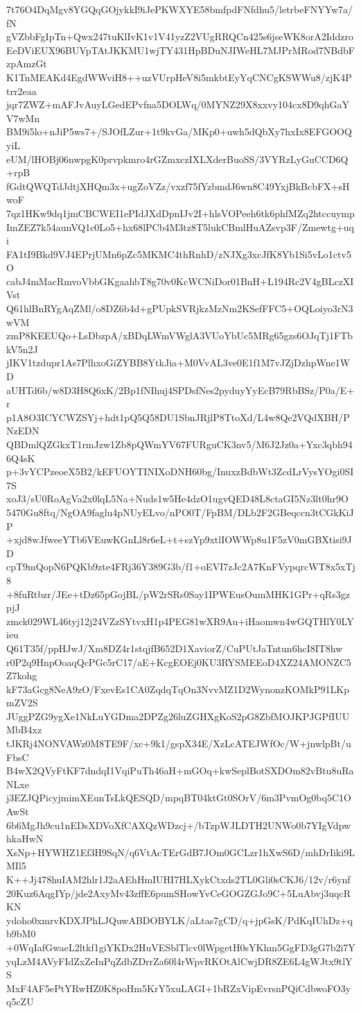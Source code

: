 7t76O4DqMgv8YGQqGOjykkI9iJePKWXYE58bmfpdFNfdhu5/letrbeFNYYw7a/fN
gVZbbFgIpTn+Qwx247tuKlIvK1v1V41yzZ2VUgRRQCn425s6jseWK8orA2Iddzro
EeDViEUX96BUVpTAtJKKMU1wjTY431HpBDuNJIWeHL7MJPrMRod7NBdbFzpAmzGt
K1TnMEAKd4EgdWWviH8++uzVUrpHeV8i5mkbtEyYqCNCgKSWWu8/zjK4Ptrr2eaa
jqr7ZWZ+mAFJvAuyLGedEPvfna5DOLWq/0MYNZ29X8xxvy104cx8D9qhGaYV7wMn
BM9i5lo+nJiP5ws7+/SJOfLZur+1t9kvGa/MKp0+uwh5dQbXy7hxIx8EFGOOQyiL
eUM/lHOBj06nwpgK0prvpkmro4rGZmxczIXLXderBuoSS/3VYRzLyGuCCD6Q+rpB
fGdtQWQTdJdtjXHQm3x+ugZoVZz/vxzf75fYzbmdJ6wn8C49YxjBkBcbFX+sHwoF
7qz1HKw9dq1jmCBCWEI1ePIdJXdDpnIJv2I+hlsVOPeeh6tk6phfMZq2htccuymp
ImZEZ7k54aunVQ1c0Lo5+hx68lPCb4M3tz8T5lukCBmlHuAZsvp3F/Zmewtg+uqi
FA1tI9Bkd9VJ4EPrjUMn6pZc5MKMC4thRnhD/zNJXg3xcJfK8Yb1Si5vLo1ctv5O
cabJ4mMacRmvoVbbGKgaahbT8g70v0KcWCNiDor01BnH+L194Rc2V4gBLczXIVst
Q61hlBnRYgAqZMl/o8DZ6b4d+gPUpkSVRjkzMzNm2KSefFFC5+OQLoiyo3rN3wVM
zmP8KEEUQo+LsDbzpA/xBDqLWmVWglA3VUoYbUc5MRg65gzs6OJqTj1FTbkV5n2J
jIKV1tzdupr1As7PlhxoGiZYBB8YtkJia+M0VvAL3ve0E1f1M7vJZjDzhpWne1WD
aUHTd6b/w8D3H8Q6xK/2Bp1fNIhuj4SPDsfNes2pyduyYyEcB79RbBSz/P0a/E+r
p1A8O3ICYCWZSYj+hdt1pQ5Q58DU1SbnJRjlP8TtoXd/L4w8Qe2VQdXBH/PNzEDN
QBDmlQZGkxT1rmJzw1Zb8pQWmYV67FURguCK3nv5/M6J2Jz0a+Yxc3qbh946Q4sK
p+3vYCPzeoeX5B2/kEFUOYTINIXoDNH60bg/InuxzBdbWt3ZcdLrVysYOgi0SI7S
xoJ3/sU0RoAgVa2x0lqL5Na+Nuds1w5He4dzO1ugvQED48L8ctaGI5Nz3lt0hr9O
5470Gu8ftq/NgOA9faglu4pNUyELvo/nPO0T/FpBM/DLb2F2GBeqccn3tCGkKiJP
+xjd8wJfweeYTb6VEuwKGnLl8r6eL+t+szYp9xtlIOWWp8u1F5zV0mGBXtisi9JD
cpT9mQopN6PQKb9zte4FRj36Y389G3b/f1+oEVI7zJc2A7KnFVypqrcWT8x5xTj8
+8fuRtbzr/JEe+tDz65pGojBL/pW2rSRs0Say1IPWEusOumMHK1GPr+qRs3gzpjJ
zmck029WL46tyj12j24VZzSYtvxH1p4PEG81wXR9Au+iHaomwn4wGQTHlY0LYieu
Q61T35f/ppHJwJ/Xm8DZ4r1stqjfB652D1XaviorZ/CuPUtJaTntun6hcI8IT8hw
r0P2q9HnpOoaqQcPGc5rC17/aE+KcgEOEj0KU3RYSMEEoD4XZ24AMONZC5Z7kohg
kF73aGcg8NeA9zO/FxevEs1CA0ZqdqTqOn3NvvMZ1D2WynonzKOMkP91LKpmZV2S
JUggPZG9ygXe1NkLuYGDma2DPZg26luZGHXgKoS2pG8ZbfMOJKPJGPfIUUMbB4xz
tJKRj4NONVAWz0M8TE9F/xc+9k1/gspX34E/XzLcATEJWfOc/W+jnwlpBt/uFbsC
B4wX2QVyFtKF7dndqI1VqiPuTh46aH+mGOq+kwSeplBotSXDOm82vBtu8uRaNLxe
j3EZJQPicyjmimXEunTsLkQESQD/mpqBT04ktGt0SOrV/6m3PvmOg0bq5C1OAwSt
6b6MgJh9cu1nEDsXDVoXfCAXQzWDzcj+/bTzpWJLDTH2UNWo0b7YIgVdpwhkaHwN
XsNp+HYWHZ1Ef3H9SqN/q6VtAcTErGdB7JOm0GCLzr1hXwS6D/mhDrIiki9LMIl5
K++Jj478huIAM2hlr1J2aAEhHmIUHI7HLXykCtxds2TL0Gli0sCKJ6/12v/r6ynf
20Kuz6AqgIYp/jde2AxyMv43zffE6pumSHowYvCeGOGZGJo9C+5LuAbvj3uqcRKN
ydoho0xmrvKDXJPhLJQuwABDOBYLK/aLtas7gCD/q+jpGsK/PdKqIUhDz+qb9bM0
+0WqIafGwaeL2ltkf1giYKDx2HuVESblTlcv0lWpgetH0sYKhm5GgFD3gG7b2i7Y
yqLzM4AVyFIdZxZeIuPqZdbZDrrZa60l4rWpvRKOtAlCwjDR8ZE6L4gWJtx9tlYS
MxF4AF5ePtYRwHZ0K8poHm5KrY5xuLAGI+1bRZxVipEvrsnPQiCdbwoFO3yq5cZU
